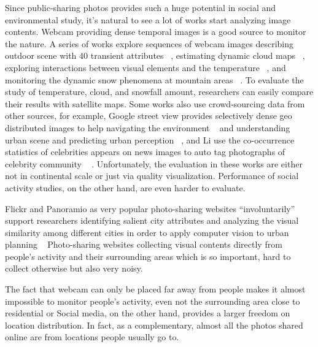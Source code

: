 Since public-sharing photos provides such a huge potential in social and environmental study, it's 
natural to see a lot of works start analyzing image contents. Webcam providing dense temporal images 
is a good source to monitor the nature. A series of works explore sequences 
of webcam images 
describing outdoor scene with 40 transient attributes ~\cite{transattri}, estimating dynamic cloud maps ~\cite{building dynamic cloud maps from groud up, webcam2satellite}, exploring interactions between visual elements and the temperature  ~\cite{hot or not}, and monitoring the dynamic snow phenomena at mountain areas ~\cite{SnowWatch: Snow Monitoring through Acquisition and Analysis of User-Generated Content, Snow phenomena modeling through online public media}. 
To evaluate the study of temperature, cloud, and snowfall amount,
 researchers can easily compare their results with satellite maps. 
Some works also use crowd-sourcing data from other sources, for example, Google street view provides selectively dense geo distributed images to help navigating the environment ~\cite{looking beyond the visible scene} and understanding urban scene and predicting urban perception ~\cite{predicting and understanding urban perception with cnn}, and Li \etal use the co-occurrence statistics of celebrities appears on news images to auto tag photographs of celebrity community ~\cite{celebritynet: a social network constructed from large scale online celebrity images}
. 
Unfortunately, 
the evaluation in these works are either not in continental scale or just via quality visualization.
Performance of social activity studies, on the other hand, are even harder to evaluate.

Flickr and Panoramio as very popular photo-sharing websites 
``involuntarily'' support researchers identifying salient city attributes and analyzing the visual similarity among different cities in order to apply computer vision to urban planning ~\cite{Recognizing city identity via attribute analysis of geo-tagged images}
Photo-sharing websites collecting visual contents directly from people's activity and their surrounding areas which is so important, hard to collect otherwise but also very noisy. 

The fact that webcam can only be placed far away from people 
 makes it almost impossible to monitor people's activity, even not the surrounding area close to
residential or  Social media, on the other hand, provides a larger freedom on location distribution. 
In fact, as a complementary, almost all the photos shared online are from locations people usually go to. 

